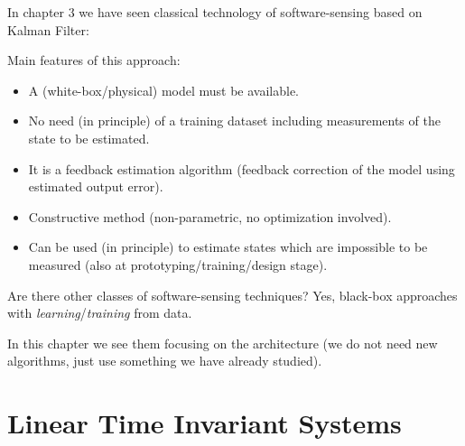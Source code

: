 In chapter 3 we have seen classical technology of software-sensing based on Kalman Filter:
\begin{figure}[H]
    \centering
\end{figure}

Main features of this approach:
\begin{itemize}
    \item A (white-box/physical) model must be available.
    \item No need (in principle) of a training dataset including measurements of the state to be estimated.
    \item It is a feedback estimation algorithm (feedback correction of the model using estimated output error).
    \item Constructive method (non-parametric, no optimization involved).
    \item Can be used (in principle) to estimate states which are impossible to be measured (also at prototyping/training/design stage).
\end{itemize}

Are there other classes of software-sensing techniques? Yes, black-box approaches with \emph{learning}/\emph{training} from data.

In this chapter we see them focusing on the architecture (we do not need new algorithms, just use something we have already studied).

\section{Linear Time Invariant Systems}

